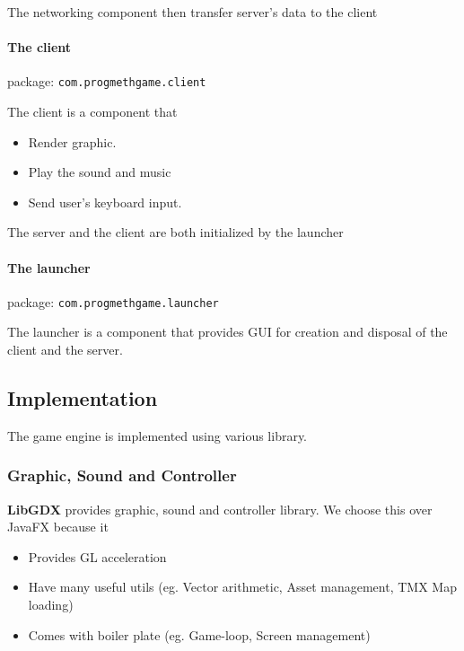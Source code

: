 \documentclass{article}
\providecommand{\tightlist}{%
	\setlength{\itemsep}{0pt}\setlength{\parskip}{0pt}}
\begin{document}
The networking component then transfer server's data to the client

\hypertarget{the-client}{%
\paragraph{The client}\label{the-client}}

package: \texttt{com.progmethgame.client}

The client is a component that

\begin{itemize}
\tightlist
\item
  Render graphic.
\item
  Play the sound and music
\item
  Send user's keyboard input.
\end{itemize}

The server and the client are both initialized by the launcher

\hypertarget{the-launcher}{%
\paragraph{The launcher}\label{the-launcher}}

package: \texttt{com.progmethgame.launcher}

The launcher is a component that provides GUI for creation and disposal
of the client and the server.

\hypertarget{implementation}{%
\subsection{Implementation}\label{implementation}}

The game engine is implemented using various library.

\hypertarget{graphic-sound-and-controller}{%
\subsubsection{Graphic, Sound and
Controller}\label{graphic-sound-and-controller}}

\textbf{LibGDX} provides graphic, sound and controller library. We
choose this over JavaFX because it

\begin{itemize}
\tightlist
\item
  Provides GL acceleration
\item
  Have many useful utils (eg. Vector arithmetic, Asset management, TMX
  Map loading)
\item
  Comes with boiler plate (eg. Game-loop, Screen management)
\end{itemize}
\end{document}
